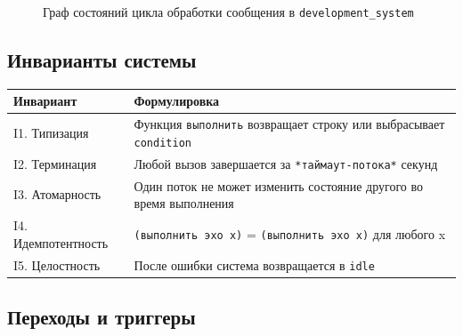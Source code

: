\documentclass[10pt, oneside]{article}
\begin{document}
\begin{figure}[H]
\caption{Граф состояний цикла обработки сообщения в \texttt{development\_system}}
\label{fig:state-graph}
\end{figure}

\subsection{Инварианты системы}

\begin{center}
\begin{tabularx}{\textwidth}{lL}
  \toprule
  \textbf{Инвариант} & \textbf{Формулировка} \\
  \midrule
  I1. Типизация & Функция \texttt{выполнить} возвращает строку или выбрасывает \texttt{condition} \\
  I2. Терминация & Любой вызов завершается за \texttt{*таймаут-потока*} секунд \\
  I3. Атомарность & Один поток не может изменить состояние другого во время выполнения \\
  I4. Идемпотентность & \texttt{(выполнить эхо x)} = \texttt{(выполнить эхо x)} для любого x \\
  I5. Целостность & После ошибки система возвращается в \texttt{idle} \\
  \bottomrule
\end{tabularx}
\end{center}

\subsection{Переходы и триггеры}
\end{document}
